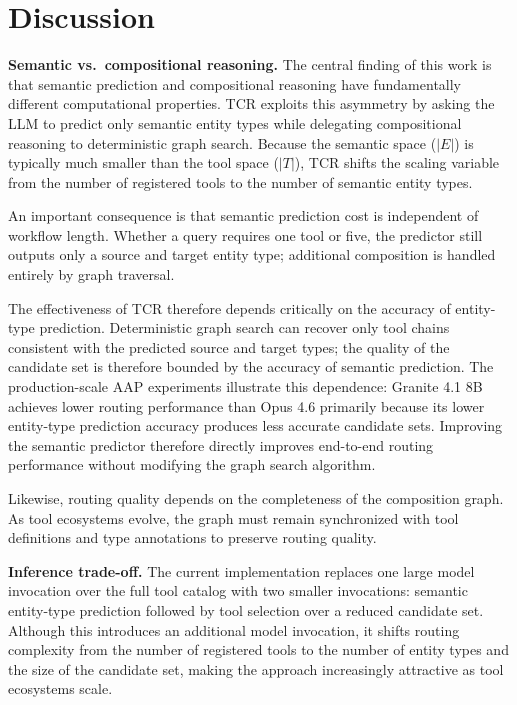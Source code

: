 \documentclass{article}
\begin{document}

\section{Discussion}

\textbf{Semantic vs.\ compositional reasoning.} The central finding of this work is that semantic prediction and compositional reasoning have fundamentally different computational properties. TCR exploits this asymmetry by asking the LLM to predict only semantic entity types while delegating compositional reasoning to deterministic graph search. Because the semantic space ($|E|$) is typically much smaller than the tool space ($|T|$), TCR shifts the scaling variable from the number of registered tools to the number of semantic entity types.

An important consequence is that semantic prediction cost is independent of workflow length. Whether a query requires one tool or five, the predictor still outputs only a source and target entity type; additional composition is handled entirely by graph traversal.

The effectiveness of TCR therefore depends critically on the accuracy of entity-type prediction. Deterministic graph search can recover only tool chains consistent with the predicted source and target types; the quality of the candidate set is therefore bounded by the accuracy of semantic prediction. The production-scale AAP experiments illustrate this dependence: Granite 4.1 8B achieves lower routing performance than Opus 4.6 primarily because its lower entity-type prediction accuracy produces less accurate candidate sets. Improving the semantic predictor therefore directly improves end-to-end routing performance without modifying the graph search algorithm.

Likewise, routing quality depends on the completeness of the composition graph. As tool ecosystems evolve, the graph must remain synchronized with tool definitions and type annotations to preserve routing quality.

\textbf{Inference trade-off.} The current implementation replaces one large model invocation over the full tool catalog with two smaller invocations: semantic entity-type prediction followed by tool selection over a reduced candidate set. Although this introduces an additional model invocation, it shifts routing complexity from the number of registered tools to the number of entity types and the size of the candidate set, making the approach increasingly attractive as tool ecosystems scale.
\end{document}
